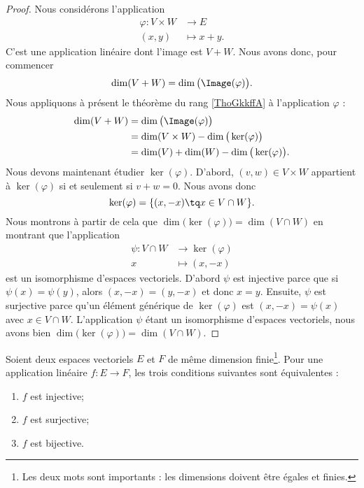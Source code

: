 \begin{proof}
	Nous considérons l'application
	\begin{equation}
		\begin{aligned}
			\varphi\colon V\times W & \to E        \\
			(x,y)                   & \mapsto x+y.
		\end{aligned}
	\end{equation}
	C'est une application linéaire dont l'image est \( V+W\). Nous avons donc, pour commencer
	\begin{equation}
		\dim(V+W)=\dim\big( \Image(\varphi) \big).
	\end{equation}
	Nous appliquons à présent le théorème du rang \ref{ThoGkkffA} à l'application \( \varphi\) :
	\begin{subequations}
		\begin{align}
			\dim(V+W) & =\dim\big( \Image(\varphi) \big)                \\
			          & =\dim(V\times W)- \dim\big( \ker(\varphi) \big) \\
			          & =\dim(V)+\dim(W)-\dim\big( \ker(\varphi) \big).
		\end{align}
	\end{subequations}
	Nous devons maintenant étudier \( \ker(\varphi)\). D'abord, \( (v,w)\in V\times W\) appartient à \( \ker(\varphi)\) si et seulement si \( v+w=0\). Nous avons donc
	\begin{equation}
		\ker(\varphi)=\{ (x,-x)\tq x\in V\cap W \}.
	\end{equation}
	Nous montrons à partir de cela que \( \dim\big( \ker(\varphi) \big)=\dim(V\cap W)\) en montrant que l'application
	\begin{equation}
		\begin{aligned}
			\psi\colon V\cap W & \to \ker(\varphi) \\
			x                  & \mapsto (x,-x)
		\end{aligned}
	\end{equation}
	est un isomorphisme d'espaces vectoriels. D'abord \( \psi\) est injective parce que si \( \psi(x)=\psi(y)\), alors \( (x,-x)=(y,-x)\) et donc \( x=y\). Ensuite, \( \psi\) est surjective parce qu'un élément générique de \( \ker(\varphi)\) est \( (x,-x)=\psi(x)\) avec \( x\in V\cap W\). L'application \( \psi\) étant un isomorphisme d'espaces vectoriels, nous avons bien \( \dim\big( \ker(\varphi) \big)=\dim(V\cap W)\).
\end{proof}

\begin{corollary}       \label{CORooCCXHooALmxKk}
	Soient deux espaces vectoriels \( E\) et \( F\) de même dimension finie\footnote{Les deux mots sont importants : les dimensions doivent être égales et finies.}. Pour une application linéaire \( f\colon E\to F\), les trois conditions suivantes sont équivalentes :
	\begin{enumerate}
		\item
		      \( f\) est injective;
		\item
		      \( f\) est surjective;
		\item
		      \( f\) est bijective.
	\end{enumerate}
\end{corollary}

